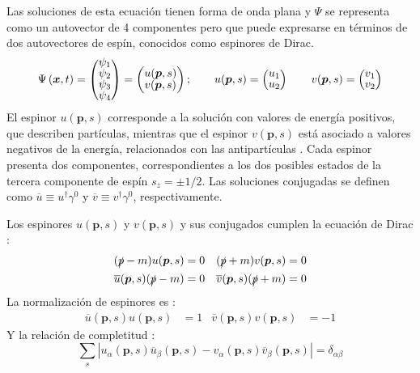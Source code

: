 Las soluciones de esta ecuación tienen forma de onda plana y $\Psi$ se representa como un autovector de 4 componentes pero que puede expresarse en términos de dos autovectores de espín, conocidos como espinores de Dirac\cite{MCR}. 
\begin{align}
\begingroup 
\renewcommand*{\arraystretch}{0.8}
\setlength\arraycolsep{10pt}
\Psi \left( \boldsymbol{x}, t\right) =\begin{pmatrix} \psi_{1} \\ \psi_{2} \\ \psi_{3} \\ \psi_{4} \end{pmatrix}=\begin{pmatrix} u(\boldsymbol{p},s) \\ v(\boldsymbol{p},s) \end{pmatrix}; \qquad u(\boldsymbol{p},s)=\begin{pmatrix} u_{1} \\ u_{2} \end{pmatrix} \qquad
v(\boldsymbol{p},s)=\begin{pmatrix} v_{1} \\ v_{2}\label{eq:espinores} \end{pmatrix}
\endgroup
\end{align}
El espinor $u(\boldsymbol{p},s)$ corresponde a la solución con valores de energía positivos, que describen partículas, mientras que el espinor $v(\boldsymbol{p},s)$ está asociado a valores negativos de la energía, relacionados con las antipartículas \cite{Donelly}. Cada espinor presenta dos componentes, correspondientes a los dos posibles estados de la tercera componente de espín $s_z=\pm 1/2$. \cite{Bettini} Las soluciones conjugadas se definen como $\overline{u} \equiv u^{\dagger} \gamma^{0}$ y $\overline{v} \equiv v^{\dagger} \gamma^{0}$, respectivamente.

Los espinores $u(\boldsymbol{p},s)$ y $v(\boldsymbol{p},s)$ y sus conjugados cumplen la ecuación de Dirac \cite{Donelly}:
\begin{align*}
(\slashed{p}-m)u(\boldsymbol{p},s) &=0 & (\slashed{p}+m)v(\boldsymbol{p},s) &=0 \\
\overline{u}(\boldsymbol{p},s)(\slashed{p}-m) &=0 & \overline{v}(\boldsymbol{p},s )(\slashed{p}+m)&=0
\end{align*}
La normalización de espinores es \cite{MCR}:
\begin{align*}
\overline{u}(\boldsymbol{p},s)u(\boldsymbol{p},s) &= 1 & \overline{v}(\boldsymbol{p},s)v(\boldsymbol{p},s) &= -1
\end{align*}
Y la relación de completitud \cite{MCR}:  %
\begin{equation*}
\sum _{s}\left| u_{\alpha }\left(\boldsymbol{p},s\right) \overline{u}_{\beta }\left(\boldsymbol{p},s\right) -v_{\alpha }\left(\boldsymbol{p},s\right) \overline{v}_{\beta }\left(\boldsymbol{p},s\right) \right| =\delta _{\alpha \beta }
\end{equation*}

